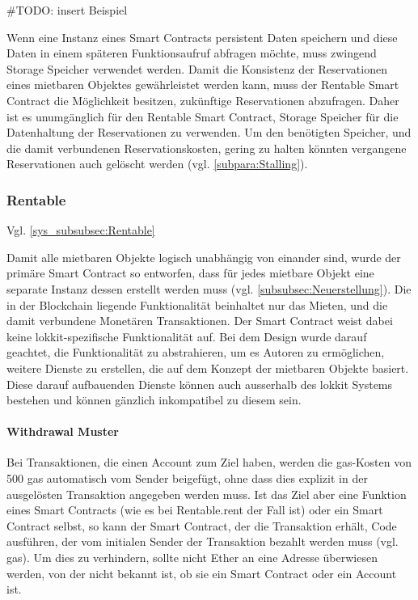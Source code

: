 \#TODO: insert Beispiel

Wenn eine Instanz eines Smart Contracts persistent Daten speichern und diese Daten in einem späteren Funktionsaufruf abfragen möchte, muss zwingend Storage Speicher verwendet werden. Damit die Konsistenz der Reservationen eines mietbaren Objektes gewährleistet werden kann, muss der Rentable Smart Contract die Möglichkeit besitzen, zukünftige Reservationen abzufragen. Daher ist es unumgänglich für den Rentable Smart Contract, Storage Speicher für die Datenhaltung der Reservationen zu verwenden. Um den benötigten Speicher, und die damit verbundenen Reservationskosten, gering zu halten könnten vergangene Reservationen auch gelöscht werden (vgl. \ref{subpara:Stalling}).

\subsubsection{Rentable}
\label{subsubsec:Rentable}
Vgl. \ref{sys_subsubsec:Rentable}

Damit alle mietbaren Objekte logisch unabhängig von einander sind, wurde der primäre Smart Contract so entworfen, dass für jedes mietbare Objekt eine separate Instanz dessen erstellt werden muss (vgl. \ref{subsubsec:Neuerstellung}). Die in der Blockchain liegende Funktionalität beinhaltet nur das Mieten, und die damit verbundene Monetären Transaktionen. Der Smart Contract weist dabei keine lokkit-spezifische Funktionalität auf. Bei dem Design wurde darauf geachtet, die Funktionalität zu abstrahieren, um es Autoren zu ermöglichen, weitere Dienste zu erstellen, die auf dem Konzept der mietbaren Objekte basiert. Diese darauf aufbauenden Dienste können auch ausserhalb des lokkit Systems bestehen und können gänzlich inkompatibel zu diesem sein.

\paragraph{Withdrawal Muster}
\label{para:Withdrawal_Muster}
Bei Transaktionen, die einen Account zum Ziel haben, werden die gas-Kosten von 500 gas automatisch vom Sender beigefügt, ohne dass dies explizit in der ausgelösten Transaktion angegeben werden muss. Ist das Ziel aber eine Funktion eines Smart Contracts (wie es bei Rentable.rent der Fall ist) oder ein Smart Contract selbst, so kann der Smart Contract, der die Transaktion erhält, Code ausführen, der vom initialen Sender der Transaktion bezahlt werden muss (vgl. gas). Um dies zu verhindern, sollte nicht Ether an eine Adresse überwiesen werden, von der nicht bekannt ist, ob sie ein Smart Contract oder ein Account ist.\cite[Wiki/Contracts and Transactions]{go-ethereum}\cite{cryptocompare.com/gas}\cite[FAQ/What is the deal with...]{solidity.readthedocs.io}

